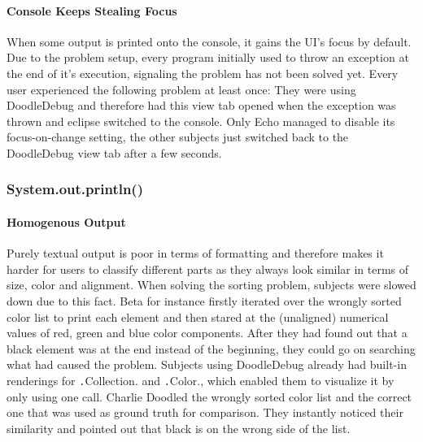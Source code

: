 \documentclass[english]{acm_proc_article-sp}
\begin{document}
\paragraph{Console Keeps Stealing Focus}
\label{console-focus-problem}
When some output is printed onto the console, it gains the UI's focus by default. 
Due to the problem setup, every program initially used to throw an exception at the end of it's execution, signaling the problem has not been solved yet. 
Every user experienced the following problem at least once: They were using DoodleDebug and therefore had this view tab opened when the exception was thrown and eclipse switched to the console. 
Only Echo managed to disable its focus-on-change setting, the other subjects just switched back to the DoodleDebug view tab after a few seconds.

\subsubsection{System.out.println()}
\paragraph{Homogenous Output}
Purely textual output is poor in terms of formatting and therefore makes it harder for users to classify different parts as they always look similar in terms of size, color and alignment. 
When solving the sorting problem, subjects were slowed down due to this fact. 
Beta for instance firstly iterated over the wrongly sorted color list to print each element and then stared at the (unaligned) numerical values of red, green and blue color components. 
After they had found out that a black element was at the end instead of the beginning, they could go on searching what had caused the problem. 
Subjects using DoodleDebug already had built-in renderings for \texttt.Collection. 
and \texttt.Color., which enabled them to visualize it by only using one call. 
Charlie Doodled the wrongly sorted color list and the correct one that was used as ground truth for comparison. 
They instantly noticed their similarity and pointed out that black is on the wrong side of the list.
\end{document}

